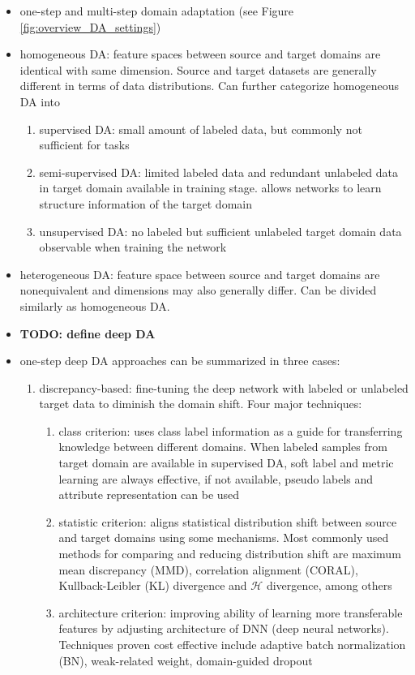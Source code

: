 \documentclass[]{article}
\newcommand{\todo}[1]{{\color{red}\bf{TODO: #1}}}
\begin{document}
\begin{itemize}
	\item one-step and multi-step domain adaptation (see Figure \ref{fig:overview_DA_settings})
	\item homogeneous DA: feature spaces between source and target domains are identical with same dimension. Source and target datasets are generally different in terms of data distributions. Can further categorize homogeneous DA into
	\begin{enumerate}
		\item supervised DA: small amount of labeled data, but commonly not sufficient for tasks
		\item semi-supervised DA: limited labeled data and redundant unlabeled data in target domain available in training stage. allows networks to learn structure information of the target domain
		\item unsupervised DA: no labeled but sufficient unlabeled target domain data observable when training the network
	\end{enumerate}
	\item heterogeneous DA: feature space between source and target domains are nonequivalent and dimensions may also generally differ. Can be divided similarly as homogeneous DA.
	\item \todo{define deep DA}
	\item one-step deep DA approaches can be summarized in three cases:
	\begin{enumerate}
		\item discrepancy-based: fine-tuning the deep network with labeled or unlabeled target data to diminish the domain shift. Four major techniques:
		\begin{enumerate}
			\item class criterion: uses class label information as a guide for transferring knowledge between different domains. When labeled samples from target domain are available in supervised DA, soft label and metric learning are always effective, if not available, pseudo labels and attribute representation can be used
			\item statistic criterion: aligns statistical distribution shift between source and target domains using some mechanisms. Most commonly used methods for comparing and reducing distribution shift are maximum mean discrepancy (MMD), correlation alignment (CORAL), Kullback-Leibler (KL) divergence and $\mathcal{H}$ divergence, among others
			\item architecture criterion: improving ability of learning more transferable features by adjusting architecture of DNN (deep neural networks). Techniques proven cost effective include adaptive batch normalization (BN), weak-related weight, domain-guided dropout

\end{enumerate}
\end{enumerate}
\end{itemize}
\end{document}
